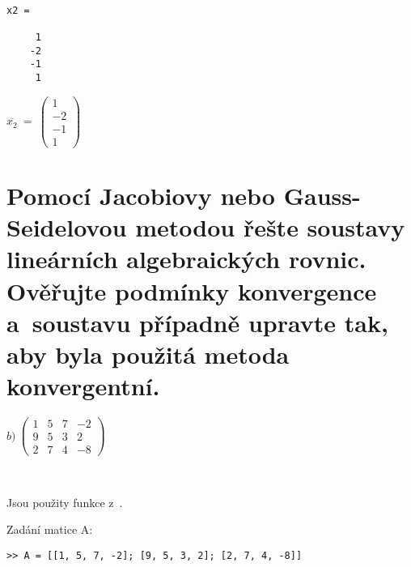 \documentclass[a4paper,10pt]{article}
\begin{document}
\begin{minipage}[t]{.5\textwidth}
\begin{verbatim}

x2 =

     1
    -2
    -1
     1

\end{verbatim}
\end{minipage}%
\begin{minipage}[t]{.5\textwidth}

\bigskip
\bigskip

$
\overline{x_2}~=~
\left( \begin{array}{r}
  1 \\
 -2 \\
 -1 \\
  1
\end{array} \right)
$
\vfill
\end{minipage}



\newpage
\section{Pomocí Jacobiovy nebo Gauss-Seidelovou metodou řešte soustavy lineárních algebraických
rovnic. Ověřujte podmínky konvergence a~soustavu případně upravte tak, aby byla použitá metoda
konvergentní.}

$
b)~
\left( \begin{array}{rrr|r}
1 & 5 & 7 & -2 \\
9 & 5 & 3 &  2 \\
2 & 7 & 4 & -8
\end{array} \right)
$

\par {~}


\par Jsou použity funkce z~. \\


\par Zadání matice A:

\begin{verbatim}
>> A = [[1, 5, 7, -2]; [9, 5, 3, 2]; [2, 7, 4, -8]]
\end{verbatim}
\end{document}

